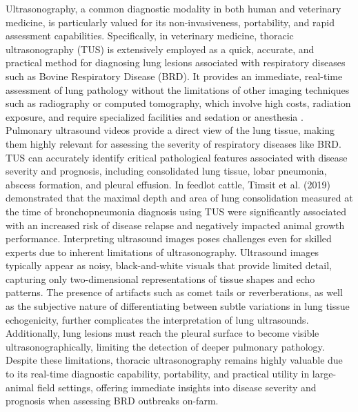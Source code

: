 Ultrasonography, a common diagnostic modality in both human and veterinary medicine, is particularly valued for its non-invasiveness, portability, and rapid assessment capabilities. Specifically, in veterinary medicine, thoracic ultrasonography (TUS) is extensively employed as a quick, accurate, and practical method for diagnosing lung lesions associated with respiratory diseases such as Bovine Respiratory Disease (BRD). It provides an immediate, real-time assessment of lung pathology without the limitations of other imaging techniques such as radiography or computed tomography, which involve high costs, radiation exposure, and require specialized facilities and sedation or anesthesia \cite{ollivett_-farm_2016}. Pulmonary ultrasound videos provide a direct view of the lung tissue, making them highly relevant for assessing the severity of respiratory diseases like BRD. TUS can accurately identify critical pathological features associated with disease severity and prognosis, including consolidated lung tissue, lobar pneumonia, abscess formation, and pleural effusion. In feedlot cattle, Timsit et al. (2019) \cite{timsit_association_2019} demonstrated that the maximal depth and area of lung consolidation measured at the time of bronchopneumonia diagnosis using TUS were significantly associated with an increased risk of disease relapse and negatively impacted animal growth performance. \cite{timsit_association_2019} Interpreting ultrasound images poses challenges even for skilled experts due to inherent limitations of ultrasonography. Ultrasound images typically appear as noisy, black-and-white visuals that provide limited detail, capturing only two-dimensional representations of tissue shapes and echo patterns. The presence of artifacts such as comet tails or reverberations, as well as the subjective nature of differentiating between subtle variations in lung tissue echogenicity, further complicates the interpretation of lung ultrasounds. Additionally, lung lesions must reach the pleural surface to become visible ultrasonographically, limiting the detection of deeper pulmonary pathology. Despite these limitations, thoracic ultrasonography remains highly valuable due to its real-time diagnostic capability, portability, and practical utility in large-animal field settings, offering immediate insights into disease severity and prognosis when assessing BRD outbreaks on-farm.


